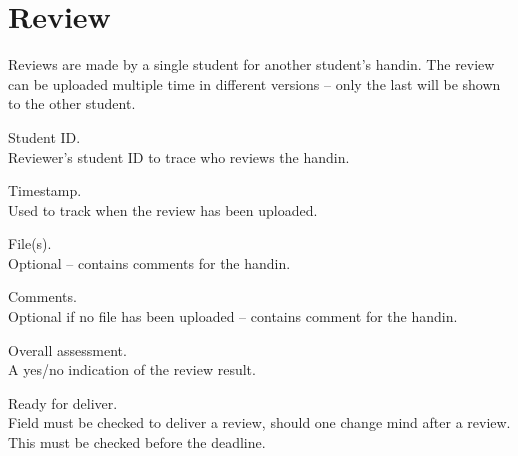 \documentclass[Main]{subfiles}
\begin{document}
\newpage

\section{Review}
Reviews are made by a single student for another student's handin. 
The review can be uploaded multiple time in different versions -- only the last will be shown to the other student.

\begin{DataIntro}
\end{DataIntro}

\begin{DataTable}


\Record
{Student ID. \\
Reviewer's student ID to trace who reviews the handin.}
{}
{}


\Record
{Timestamp. \\
Used to track when the review has been uploaded.}
{}
{}


\Record
{File(s). \\
Optional -- contains comments for the handin.}
{}
{}


\Record
{Comments.\\
Optional if no file has been uploaded -- contains comment for the handin.}
{}
{}

\Record
{Overall assessment. \\
A yes/no indication of the review result.}
{}
{}

\Record
{Ready for deliver.\\
Field must be checked to deliver a review, should one change mind after a review.
This must be checked before the deadline.}
{}
{}
\end{DataTable}





%
%
%
%
%
%
%
\end{document}
